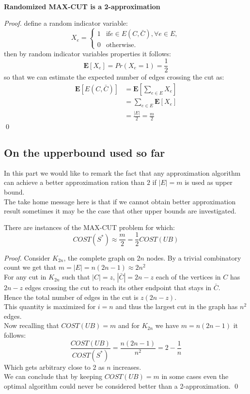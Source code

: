 \begin{theorem}{} 
	\textbf{Randomized MAX-CUT is a 2-approximation}
\end{theorem}
\begin{proof}
	define a random indicator variable:
\begin{equation*}
	X_{e} = 
	  \begin{cases}
	    1 &  \text{if} e \in E(C,\bar{C}), \forall e \in E,\\
        0 &  \text{otherwise}.
	  \end{cases}
\end{equation*}
then by random indicator variables properties it follows:
\[ \mathbf{E}[X_{e}] = Pr(X_{e} = 1) = \frac{1}{2} \]
so that we can estimate the expected number of edges crossing the cut as:
\begin{align*}
\mathbf{E}[E(C,\bar{C})] & = \mathbf{E}[\sum_{e \in E} X_{e}] \\
						 & = \sum_{e \in E} \mathbf{E}[X_{e}] \\
						 & = \frac{|E|}{2} = \frac{m}{2}
\end{align*}
\qed
\end{proof}


\subsection{On the upperbound used so far}
In this part we would like to remark the fact that any approximation algorithm can achieve a better approximation ration than $ 2 $ if $ |E|=m $ is used as upper bound.\\
The take home message here is that if we cannot obtain better approximation result sometimes it may be the case that other upper bounds are investigated.
\begin{claim}
	There are instances of the MAX-CUT problem for which:
	\[COST(S^{*}) \approx \frac{m}{2} = \frac{1}{2} COST(UB) \]
\end{claim}
\begin{proof}
Consider $ K_{2n} $, the complete graph on $ 2n $ nodes. By a trivial combinatory count we get that $ m = |E|= n(2n-1) \approx 2n^2 $\\
For any cut in $ K_{2n} $ such that $ |C|= z $, $ |\bar{C}|= 2n-z $ each of the vertices in $ C $ has $ 2n-z $ edges crossing the cut to reach its other endpoint that stays in $ \bar{C} $.\\
Hence the total number of edges in the cut is $ z(2n-z) $.\\
This quantity is maximized for $ i=n $ and thus the largest cut in the graph has $ n^2 $ edges.\\
Now recalling that $ COST(UB)=m $ and for $ K_{2n} $ we have $ m=n(2n-1) $ it follows:
\[ \frac{COST(UB)}{COST(S^{*})} = \frac{n(2n-1)}{n^2} = 2 - \frac{1}{n}  \]
Which gets arbitrary close to $ 2 $ as $ n $ increases. \\
We can conclude that by keeping $ COST(UB)=m $ in some cases even the optimal algorithm could never be considered better than a 2-approximation.
\qed
\end{proof}

